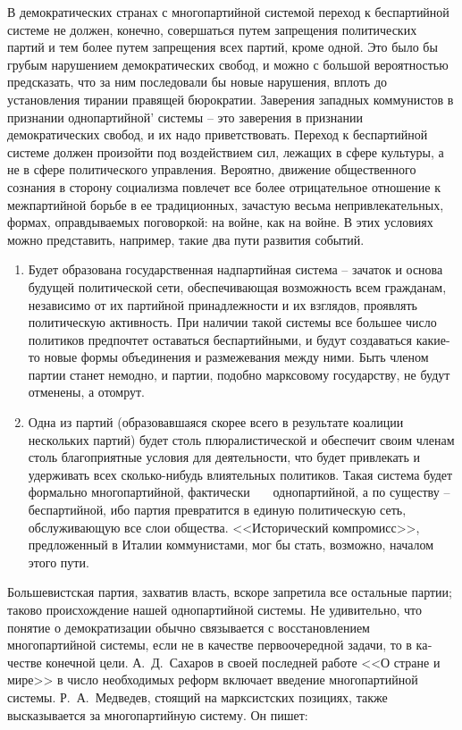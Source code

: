 \documentclass{book}
\begin{document}
В демократических странах с многопартийной системой пе­реход к беспартийной системе не должен, конечно, совершать­ся путем запрещения политических партий и тем более путем запрещения всех партий, кроме одной. Это было бы грубым нарушением демократических свобод, и можно с большой вероятностью предсказать, что за ним последовали бы новые нарушения, вплоть до установления тирании правящей бюрократии. Заверения западных коммунистов в признании однопартийной' системы -- это заверения в признании демократических свобод, и их надо приветствовать. Переход к беспартийной системе должен произойти под воздействием сил, лежащих в сфере культуры, а не в сфере политического управления. Вероятно, движение общественного сознания в сторону социализма повлечет все более отрицательное отношение к межпартийной борьбе в ее традиционных, зачастую весьма непривлекательных, формах, оправдываемых поговоркой: на войне, как на войне. В этих условиях можно представить, например, такие два пути развития событий.

\begin{enumerate}
 \item Будет образована государственная надпартийная систе­ма -- зачаток и основа будущей политической сети, обеспечи­вающая возможность всем гражданам, независимо от их партий­ной принадлежности и их взглядов, проявлять политическую активность. При наличии такой системы все большее число по­литиков предпочтет оставаться беспартийными, и будут созда­ваться какие-то новые формы объединения и размежевания между ними. Быть членом партии станет немодно, и партии, подобно марксовому государству, не будут отменены, а отомрут. 
 \item Одна из партий (образовавшаяся скорее всего в резуль­тате коалиции нескольких партий) будет столь плюралисти­ческой и обеспечит своим членам столь благоприятные условия для деятельности, что будет привлекать и удерживать всех сколько-нибудь влиятельных политиков. Такая система будет формально многопартийной, фактически    однопартийной, а по существу -- беспартийной, ибо партия превратится в еди­ную политическую сеть, обслуживающую все слои общества. <<Исторический компромисс>>, предложенный в Италии комму­нистами, мог бы стать, возможно, началом этого пути.
\end{enumerate}

Большевистская партия, захватив власть, вскоре запретила все остальные партии; таково происхождение нашей однопар­тийной системы. Не удивительно, что понятие о демократиза­ции обычно связывается с восстановлением многопартийной системы, если не в качестве первоочередной задачи, то в ка­честве конечной цели. А.~Д.~Сахаров в своей последней работе <<О стране и мире>> в число необходимых реформ включает введение многопартийной системы. Р.~А.~Медведев, стоящий на марксистских позициях, также высказывается за многопартий­ную систему. Он пишет:
\end{document}
